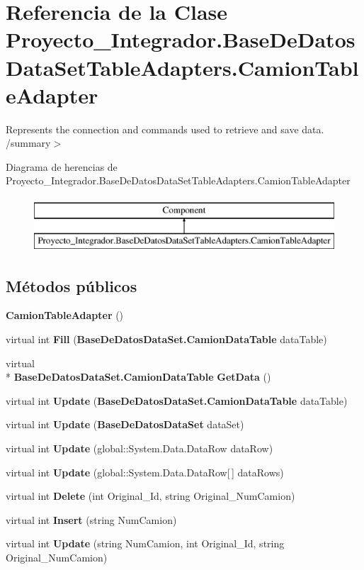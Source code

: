 \section{Referencia de la Clase Proyecto\-\_\-\-Integrador.\-Base\-De\-Datos\-Data\-Set\-Table\-Adapters.\-Camion\-Table\-Adapter}
\label{class_proyecto___integrador_1_1_base_de_datos_data_set_table_adapters_1_1_camion_table_adapter}


Represents the connection and commands used to retrieve and save data. /summary$>$  


Diagrama de herencias de Proyecto\-\_\-\-Integrador.\-Base\-De\-Datos\-Data\-Set\-Table\-Adapters.\-Camion\-Table\-Adapter\begin{figure}[H]
\begin{center}
\leavevmode
\includegraphics[height=2.000000cm]{class_proyecto___integrador_1_1_base_de_datos_data_set_table_adapters_1_1_camion_table_adapter}
\end{center}
\end{figure}
\subsection*{Métodos públicos}
\begin{DoxyCompactItemize}
\item 
{\bf Camion\-Table\-Adapter} ()
\item 
virtual int {\bf Fill} ({\bf Base\-De\-Datos\-Data\-Set.\-Camion\-Data\-Table} data\-Table)
\item 
virtual \\*
{\bf Base\-De\-Datos\-Data\-Set.\-Camion\-Data\-Table} {\bf Get\-Data} ()
\item 
virtual int {\bf Update} ({\bf Base\-De\-Datos\-Data\-Set.\-Camion\-Data\-Table} data\-Table)
\item 
virtual int {\bf Update} ({\bf Base\-De\-Datos\-Data\-Set} data\-Set)
\item 
virtual int {\bf Update} (global\-::\-System.\-Data.\-Data\-Row data\-Row)
\item 
virtual int {\bf Update} (global\-::\-System.\-Data.\-Data\-Row[$\,$] data\-Rows)
\item 
virtual int {\bf Delete} (int Original\-\_\-\-Id, string Original\-\_\-\-Num\-Camion)
\item 
virtual int {\bf Insert} (string Num\-Camion)
\item 
virtual int {\bf Update} (string Num\-Camion, int Original\-\_\-\-Id, string Original\-\_\-\-Num\-Camion)
\end{DoxyCompactItemize}
